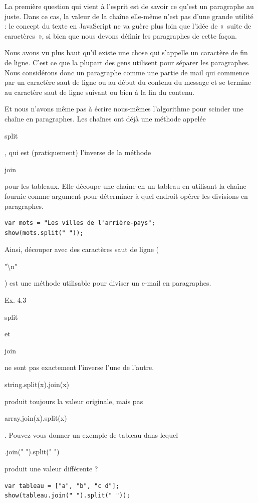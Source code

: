 \documentclass{FramateX}
\renewcommand{\texttt}[1]{\begin{sffamily}{#1}\end{sffamily}}
\begin{document}
\begin{center}\end{center}

La première question qui vient à l'esprit est de savoir ce qu'est un
paragraphe au juste. Dans ce cas, la valeur de la chaîne elle-même n'est
pas d'une grande utilité : le concept du texte en JavaScript ne va guère
plus loin que l'idée de «~suite de caractères~», si bien que nous devons
définir les paragraphes de cette façon.

Nous avons vu plus haut qu'il existe une chose qui s'appelle un
caractère de fin de ligne. C'est ce que la plupart des gens utilisent
pour séparer les paragraphes. Nous considérons donc un paragraphe comme
une partie de mail qui commence par un caractère saut de ligne ou au
début du contenu du message et se termine au caractère saut de ligne
suivant ou bien à la fin du contenu.

Et nous n'avons même pas à écrire nous-mêmes l'algorithme pour scinder
une chaîne en paragraphes. Les chaînes ont déjà une méthode appelée
\texttt{split}, qui est (pratiquement) l'inverse de la méthode
\texttt{join} pour les tableaux. Elle découpe une chaîne en un tableau
en utilisant la chaîne fournie comme argument pour déterminer à quel
endroit opérer les divisions en paragraphes.

\begin{lstlisting}
var mots = "Les villes de l'arrière-pays";
show(mots.split(" "));
\end{lstlisting}
Ainsi, découper avec des caractères saut de ligne
(\texttt{"\textbackslash{}n"}) est une méthode utilisable pour diviser
un e-mail en paragraphes.

\begin{center}\end{center}

Ex. 4.3

\texttt{split} et \texttt{join} ne sont pas exactement l'inverse l'une
de l'autre. \texttt{string.split(x).join(x)} produit toujours la valeur
originale, mais pas \texttt{array.join(x).split(x)}. Pouvez-vous donner
un exemple de tableau dans lequel \texttt{.join(" ").split(" ")} produit
une valeur différente ?

\begin{lstlisting}
var tableau = ["a", "b", "c d"];
show(tableau.join(" ").split(" "));
\end{lstlisting}
\begin{center}\end{center}
\end{document}
